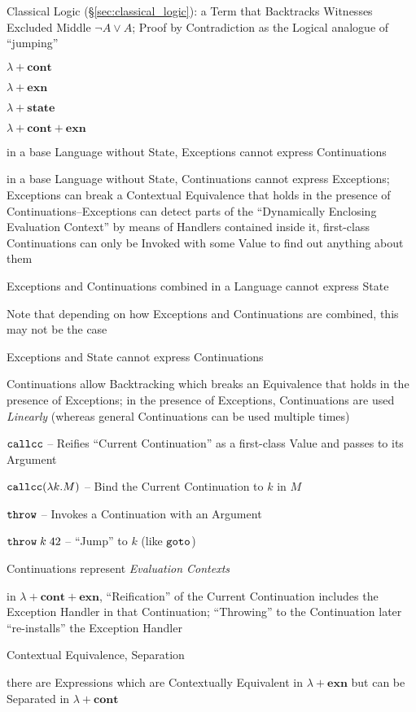 Classical Logic (\S\ref{sec:classical_logic}): a Term that Backtracks
Witnesses Excluded Middle $\neg A \vee A$; Proof by Contradiction as
the Logical analogue of ``jumping''

$\lambda + \mathbf{cont}$

$\lambda + \mathbf{exn}$

$\lambda + \mathbf{state}$

$\lambda + \mathbf{cont} + \mathbf{exn}$

in a base Language without State, Exceptions cannot express
Continuations

in a base Language without State, Continuations cannot express
Exceptions; Exceptions can break a Contextual Equivalence that holds
in the presence of Continuations--Exceptions can detect parts of the
``Dynamically Enclosing Evaluation Context'' by means of Handlers
contained inside it, first-class Continuations can only be Invoked
with some Value to find out anything about them

Exceptions and Continuations combined in a Language cannot express
State

\fist Note that depending on how Exceptions and Continuations are
combined, this may not be the case

Exceptions and State cannot express Continuations

Continuations allow Backtracking which breaks an Equivalence that
holds in the presence of Exceptions; in the presence of Exceptions,
Continuations are used \emph{Linearly} (whereas general Continuations
can be used multiple times)

$\mathtt{callcc}$ -- Reifies ``Current Continuation'' as a first-class Value
and passes to its Argument %

$\mathtt{callcc}(\lambda k.M)$ -- Bind the Current Continuation to $k$ in $M$

$\mathtt{throw}$ -- Invokes a Continuation with an Argument

$\mathtt{throw}\;k\;42$ -- ``Jump'' to $k$ (like $\mathtt{goto}$)

Continuations represent \emph{Evaluation Contexts}

in $\lambda + \mathbf{cont} + \mathbf{exn}$, ``Reification'' of the
Current Continuation includes the Exception Handler in that
Continuation; ``Throwing'' to the Continuation later ``re-installs''
the Exception Handler

Contextual Equivalence, Separation %

there are Expressions which are Contextually Equivalent in $\lambda +
\mathbf{exn}$ but can be Separated in $\lambda + \mathbf{cont}$

